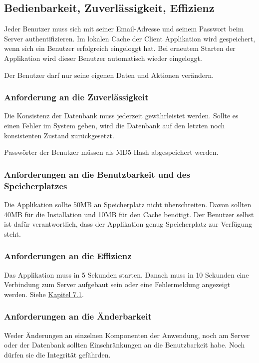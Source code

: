 \documentclass[a4paper,12pt,oneside]{scrartcl}
\begin{document}
\subsection{Bedienbarkeit, Zuverlässigkeit, Effizienz}
Jeder Benutzer muss sich mit seiner Email-Adresse und seinem Passwort beim Server authentifizieren. 
Im lokalen Cache der Client Applikation wird gespeichert, wenn sich ein Benutzer erfolgreich eingeloggt hat. 
Bei erneutem Starten der Applikation wird dieser Benutzer automatisch wieder eingeloggt. 

Der Benutzer darf nur seine eigenen Daten und Aktionen verändern.



\subsubsection{Anforderung an die Zuverlässigkeit}
Die Konsistenz der Datenbank muss jederzeit gewährleistet werden.
Sollte es einen Fehler im System geben, wird die Datenbank auf den letzten noch konsistenten Zustand zurückgesetzt.

Passwörter der Benutzer müssen als MD5-Hash abgespeichert werden.


\subsubsection{Anforderungen an die Benutzbarkeit und des Speicherplatzes}
Die Applikation sollte 50MB an Speicherplatz nicht überschreiten.
Davon sollten 40MB für die Installation und 10MB für den Cache benötigt.
Der Benutzer selbst ist dafür verantwortlich, dass der Applikation genug Speicherplatz zur Verfügung steht. 


\subsubsection{Anforderungen an die Effizienz}
Das Applikation muss in 5 Sekunden starten.
Danach muss in 10 Sekunden eine Verbindung zum Server aufgebaut sein oder eine Fehlermeldung angezeigt werden.
Siehe \hyperlink{s07}{Kapitel 7.1}.


\subsubsection{Anforderungen an die Änderbarkeit}
Weder Änderungen an einzelnen Komponenten der Anwendung, noch am Server oder der Datenbank sollten Einschränkungen an die Benutzbarkeit habe.
Noch dürfen sie die Integrität gefährden.
\end{document}
